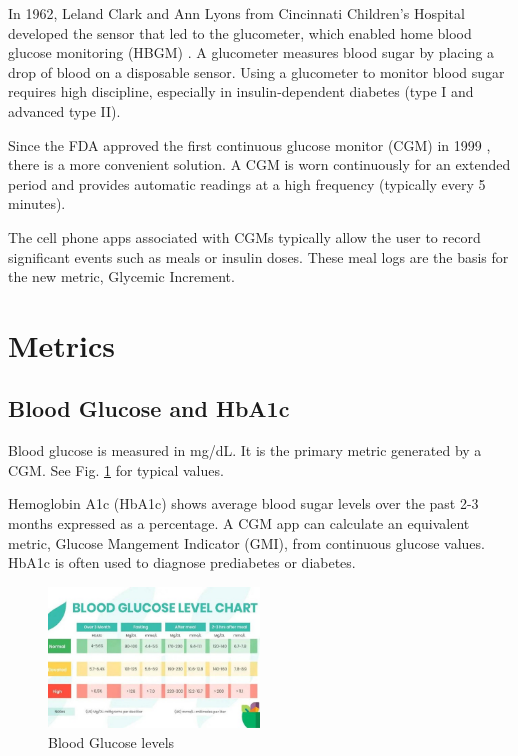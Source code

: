 \documentclass[conference]{IEEEtran}
\begin{document}
In 1962, Leland Clark and Ann Lyons from Cincinnati Children's Hospital developed the sensor that led to the glucometer, which enabled home blood glucose monitoring (HBGM) \cite{Clark_1962}. A glucometer measures blood sugar by placing a drop of blood on a disposable sensor. Using a glucometer to monitor blood sugar requires high discipline, especially in insulin-dependent diabetes (type I and advanced type II).

Since the FDA approved the first continuous glucose monitor (CGM) in 1999 \cite{Reddy_2023}, there is a more convenient solution. A CGM is worn continuously for an extended period and provides automatic readings at a high frequency (typically every 5 minutes).

The cell phone apps associated with CGMs typically allow the user to record significant events such as meals or insulin doses. These meal logs are the basis for the new metric, Glycemic Increment.

\section{Metrics}

\subsection{Blood Glucose and HbA1c}

Blood glucose is measured in mg/dL. It is the primary metric generated by a CGM. See Fig. \ref{fig:glucose_chart} for typical values.

Hemoglobin A1c (HbA1c) shows average blood sugar levels over the past 2-3 months expressed as a percentage. A CGM app can calculate an equivalent metric, Glucose Mangement Indicator (GMI), from continuous glucose values. HbA1c is often used to diagnose prediabetes or diabetes.

\begin{figure}[tbp]
    \includegraphics[width=0.5\textwidth]{images/Normal-Blood-Sugar-Levels-Chart.jpg}
    \caption{Blood Glucose levels
    \protect\cite{Agarwal_2025}}
    \label{fig:glucose_chart}
\end{figure}
\end{document}
